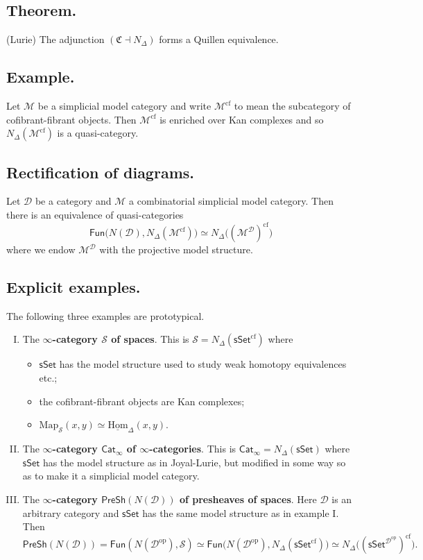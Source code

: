 \documentclass{article}
\numberwithin{equation}{subsection}
\renewcommand{\ss}[1]{\subsection{#1}}
\newcommand{\Hom}{\mathrm{Hom}}
\newcommand{\sset}{\mathsf{sSet}}
\newcommand{\D}{\mathcal{D}}
\newcommand{\Map}{\mathrm{Map}}
\renewcommand{\S}{\mathcal{S}}
\renewcommand{\P}{\mathsf{PreSh}}
\begin{document}
        \ss{Theorem.} (Lurie)
            The adjunction $(\mathfrak{C}\dashv N_\Delta)$ forms a Quillen equivalence.

        \ss{Example.}
            Let $\mathcal{M}$ be a simplicial model category and write $\mathcal{M}^\mathrm{cf}$ to mean the subcategory of cofibrant-fibrant objects.
            Then $\mathcal{M}^\mathrm{cf}$ is enriched over Kan complexes and so $N_\Delta(\mathcal{M}^\mathrm{cf})$ is a quasi-category.

        \ss{Rectification of diagrams.}
            Let $\D$ be a category and $\mathcal{M}$ a combinatorial simplicial model category.
            Then there is an equivalence of quasi-categories
            \[
                \mathsf{Fun}\Big(N(\D),N_\Delta(\mathcal{M}^\textrm{cf})\Big) \simeq N_\Delta\Big((\mathcal{M}^\D)^\mathrm{cf}\Big)
            \]
            where we endow $\mathcal{M}^\D$ with the projective model structure.

        \ss{Explicit examples.}
            The following three examples are prototypical.
            \begin{enumerate}[I.]
                \item The \textbf{$\infty$-category $\S$ of spaces}.
                    This is $\S=N_\Delta(\sset^\mathrm{cf})$ where
                    \begin{itemize}
                        \item $\sset$ has the model structure used to study weak homotopy equivalences etc.;
                        \item the cofibrant-fibrant objects are Kan complexes;
                        \item $\Map_\S(x,y)\simeq\underline{\Hom}_{\Delta}(x,y)$.
                    \end{itemize}
                \item The \textbf{$\infty$-category $\mathsf{Cat}_\infty$ of $\infty$-categories}.
                    This is $\mathsf{Cat}_\infty=N_\Delta(\sset)$ where $\sset$ has the model structure as in Joyal-Lurie, but modified in some way so as to make it a simplicial model category.
                \item The \textbf{$\infty$-category $\P(N(\D))$ of presheaves of spaces}.
                    Here $\D$ is an arbitrary category and $\sset$ has the same model structure as in example I.
                    Then
                    \[
                        \P(N(\D)) = \mathsf{Fun}(N(\D^\mathrm{op}),\S) \simeq \mathsf{Fun}\Big(N(\D^\mathrm{op}), N_\Delta(\sset^\mathrm{cf})\Big) \simeq N_\Delta\Big((\sset^{\D^\mathrm{op}})^\mathrm{cf}\Big).
                    \]
            \end{enumerate}
\end{document}
